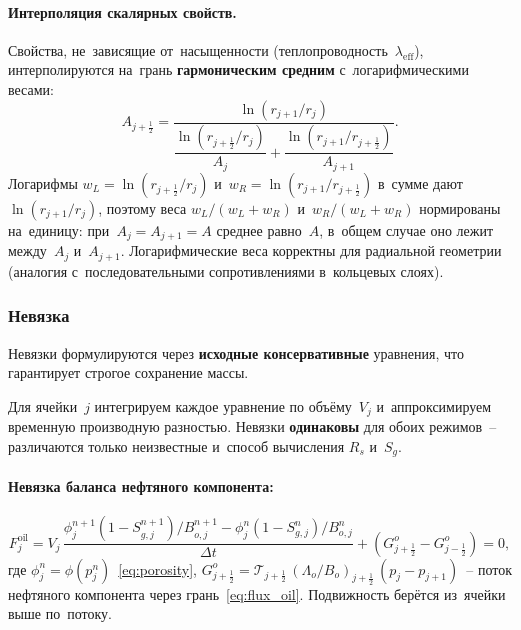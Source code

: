 \documentclass[12pt,a4paper]{article}
\newcommand{\half}{\tfrac{1}{2}}
\newcommand{\leff}{\lambda_{\mathrm{eff}}}
\begin{document}
\paragraph{Интерполяция скалярных свойств.}
Свойства, не~зависящие от~насыщенности (теплопроводность~$\leff$),
интерполируются на~грань \textbf{гармоническим средним}
с~логарифмическими весами:
\begin{equation}\label{eq:face_interp}
  A_{j+\half} = \frac{\ln(r_{j+1}/r_j)}{\dfrac{\ln(r_{j+\half}/r_j)}{A_j}
    + \dfrac{\ln(r_{j+1}/r_{j+\half})}{A_{j+1}}}.
\end{equation}
Логарифмы $w_L = \ln(r_{j+\half}/r_j)$ и~$w_R = \ln(r_{j+1}/r_{j+\half})$
в~сумме дают $\ln(r_{j+1}/r_j)$, поэтому веса $w_L/(w_L + w_R)$
и~$w_R/(w_L + w_R)$ нормированы на~единицу: при~$A_j = A_{j+1} = A$
среднее равно~$A$, в~общем случае оно лежит между~$A_j$ и~$A_{j+1}$.
Логарифмические веса корректны для радиальной геометрии
(аналогия с~последовательными сопротивлениями в~кольцевых слоях).


\subsubsection{Невязка}

Невязки формулируются через \textbf{исходные консервативные}
уравнения, что гарантирует строгое сохранение массы.

Для ячейки~$j$ интегрируем каждое уравнение по объёму~$V_j$
и~аппроксимируем временную производную разностью. Невязки
\textbf{одинаковы} для обоих режимов~-- различаются только
неизвестные и~способ вычисления $R_s$ и~$S_g$.

\paragraph{Невязка баланса нефтяного компонента:}
\begin{equation}\label{eq:residual_oil}
  \boxed{
    F_j^{\text{oil}} = V_j\,
      \frac{\phi_j^{n+1}(1 - S_{g,j}^{n+1})/B_{o,j}^{n+1}
            - \phi_j^n(1 - S_{g,j}^n)/B_{o,j}^n}{\Delta t}
      + \left(G_{j+\half}^{o} - G_{j-\half}^{o}\right) = 0,
  }
\end{equation}
где $\phi_j^n = \phi(p_j^n)$~\eqref{eq:porosity}, $G_{j+\half}^{o} = \mathcal{T}_{j+\half}\,
(\Lambda_o/B_o)_{j+\half}\,(p_j - p_{j+1})$~-- поток нефтяного
компонента через грань~\eqref{eq:flux_oil}. Подвижность берётся
из~ячейки выше по~потоку.
\end{document}
